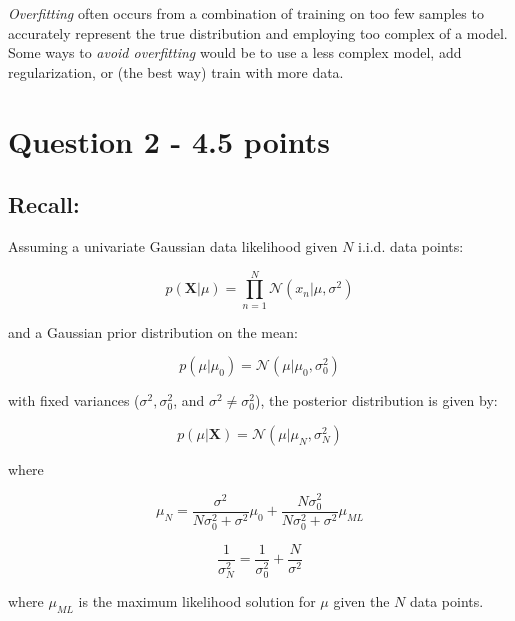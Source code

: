 \documentclass[11pt]{article}
\begin{document}
\noindent 
\emph{Overfitting} often occurs from a combination of training on too few samples to accurately represent the true distribution and employing too complex of a model. \\
\noindent
Some ways to \emph{avoid overfitting} would be to use a less complex model, add regularization, or (the best way) train with more data.

\section*{Question 2 - 4.5 points}

\subsection*{Recall:}

Assuming a univariate Gaussian data likelihood given $N$ i.i.d. data points:

\begin{equation}
p(\mathbf{X}|\mu) = \prod^{N}_{n=1}\mathcal{N}(x_n|\mu,\sigma^2)
\end{equation}

and a Gaussian prior distribution on the mean:

\begin{equation}
p(\mu|\mu_0) = \mathcal{N}(\mu|\mu_0,\sigma^{2}_{0})
\end{equation}

with fixed variances ($\sigma^2, \sigma^{2}_{0}$, and $\sigma^2 \neq \sigma^{2}_{0}$), the posterior distribution is given by:

\begin{equation}
p(\mu|\mathbf{X}) = \mathcal{N}(\mu|\mu_N,\sigma^{2}_{N})
\end{equation}

where

\begin{equation}
\mu_N = \frac{\sigma^2}{N\sigma^{2}_{0} + \sigma^2}\mu_0 + \frac{N\sigma^{2}_{0}}{N\sigma^{2}_{0} + \sigma^2}\mu_{ML}
\end{equation}

\begin{equation}
\frac{1}{\sigma^{2}_{N}} = \frac{1}{\sigma^{2}_0} + \frac{N}{\sigma^{2}}
\end{equation}

where $\mu_{ML}$ is the maximum likelihood solution for $\mu$ given the $N$ data points.
\end{document}
